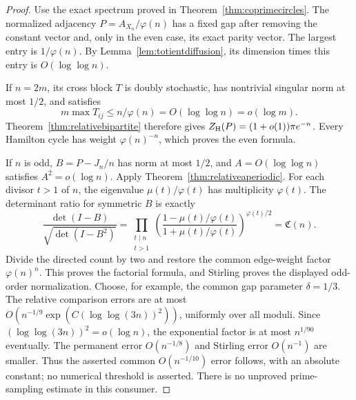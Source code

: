 \begin{proof}
Use the exact spectrum proved in Theorem~\ref{thm:coprimecircles}.
The normalized adjacency \(P=A_{X_n}/\varphi(n)\) has a
fixed gap after removing the constant vector and, only in
the even case, its exact parity vector.
The largest entry is \(1/\varphi(n)\).
By Lemma~\ref{lem:totientdiffusion}, its dimension times this
entry is \(O(\log\log n)\).

If \(n=2m\), its cross block \(T\) is doubly stochastic,
has nontrivial singular norm at most \(1/2\), and satisfies
\[
 m\max T_{ij}\leq n/\varphi(n)=O(\log\log n)=o(\log m).
\]
Theorem~\ref{thm:relativebipartite} therefore gives
\(Z_{\rm H}(P)=(1+o(1))\pi e^{-n}\).
Every Hamilton cycle has weight \(\varphi(n)^{-n}\),
which proves the even formula.

If \(n\) is odd, \(B=P-J_n/n\) has norm at most \(1/2\), and
\(A=O(\log\log n)\) satisfies \(A^2=o(\log n)\).
Apply Theorem~\ref{thm:relativeaperiodic}.
For each divisor \(t>1\) of \(n\), the eigenvalue
\(\mu(t)/\varphi(t)\) has multiplicity \(\varphi(t)\).
The determinant ratio for symmetric \(B\) is exactly
\[
 \frac{\det(I-B)}{\sqrt{\det(I-B^2)}}
   =\prod_{\substack{t\mid n\\t>1}}
       \left(\frac{1-\mu(t)/\varphi(t)}
                  {1+\mu(t)/\varphi(t)}\right)^{\varphi(t)/2}
   ={\mathfrak C}(n).
\]
Divide the directed count by two and restore the common
edge-weight factor \(\varphi(n)^n\).
This proves the factorial formula, and Stirling proves the
displayed odd-order normalization.
Choose, for example, the common gap parameter \(\delta=1/3\).
The relative comparison errors are at most
\(O(n^{-1/9}\exp(C(\log\log(3n))^2))\), uniformly over
all moduli. Since \((\log\log(3n))^2=o(\log n)\), the
exponential factor is at most \(n^{1/90}\) eventually.
The permanent error \(O(n^{-1/8})\) and Stirling error
\(O(n^{-1})\) are smaller. Thus the asserted common
\(O(n^{-1/10})\) error follows, with an absolute constant;
no numerical threshold is asserted.
There is no unproved prime-sampling estimate in this consumer.
\end{proof}

